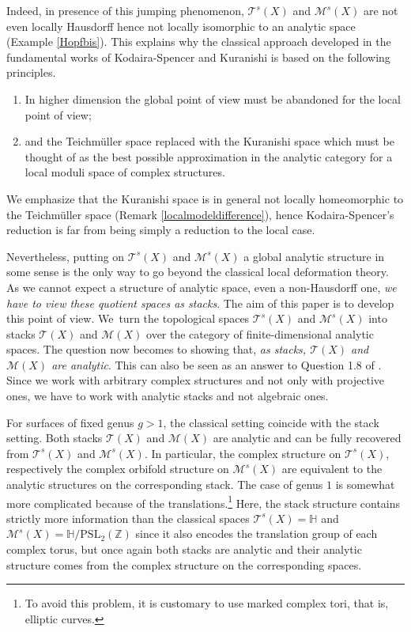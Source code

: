\documentclass[10pt]{amsart}
\let\mathcal\mathscr
\newcommand{\PSL}{\mathrm{PSL}}
\theoremstyle{plain}
\theoremstyle{definition}
\theoremstyle{remark}
\numberwithin{equation}{section}
\newcommand{\T}{\mathcal T(X)}
\begin{document}
Indeed, in presence of this jumping phenomenon, $\mathcal T^s(X)$ and $\mathcal M^s(X)$ are not even locally Hausdorff hence not locally isomorphic to an analytic space (\cf Example \ref{Hopfbis}). This explains why the classical approach developed in the fundamental works of Kodaira-Spencer and Kuranishi is based on the following principles.
\begin{enumerate}
\item
In higher dimension the global point of view must be abandoned for the local point of view;
\item
and the Teichmüller space replaced with the Kuranishi space which must be thought of as the best possible approximation in the analytic category for a local moduli space of complex structures.
\end{enumerate}

We emphasize that the Kuranishi space is in general not locally homeomorphic to the Teichmüller space (\cf Remark \ref{localmodeldifference}), hence Kodaira-Spencer's reduction is far from being simply a reduction to the local case.

Nevertheless, putting on $\mathcal T^s(X)$ and $\mathcal M^s(X)$ a global analytic structure in some sense is the only way to go beyond the classical local deformation theory. As we cannot expect a structure of analytic space, even a non-Hausdorff one, \emph{we have to view these quotient spaces as stacks}. The aim of this paper is to develop this point of view. We~turn the topological spaces $\mathcal T^s(X)$ and $\mathcal M^s(X)$ into stacks $\T$ and $\mathcal M(X)$ over the category of finite-dimensional analytic spaces. The question now becomes to showing that, \emph{as stacks, $\T$ and $\mathcal M(X)$ are analytic}. This can also be seen as an answer to Question 1.8 of \cite{VerbitskySurvey}. Since we work with arbitrary complex structures and not only with projective ones, we have to work with analytic stacks and not algebraic ones.

For surfaces of fixed genus $g>1$, the classical setting coincide with the stack setting. Both stacks $\T$ and $\mathcal M(X)$ are analytic and can be fully recovered from $\mathcal T^s(X)$ and $\mathcal M^s(X)$. In particular, the complex structure on $\mathcal T^s(X)$, respectively the complex orbifold structure on $\mathcal M^s(X)$ are equivalent to the analytic structures on the corresponding stack. The case of genus $1$ is somewhat more complicated because of the translations.\footnote{To avoid this problem, it is customary to use marked complex tori, that is, elliptic curves.} Here, the stack structure contains strictly more information than the classical spaces $\mathcal T^s(X)=\mathbb H$ and $\mathcal M^s(X)=\mathbb H/\PSL_2(\mathbb Z)$ since it also encodes the translation group of each complex torus, but once again both stacks are analytic and their analytic structure comes from the complex structure on the corresponding spaces.
\end{document}
